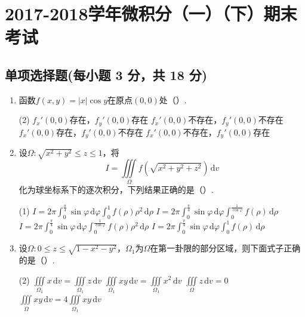 \documentclass[../main.tex]{subfiles}
\begin{document}
\chapter{2017-2018学年微积分（一）（下）期末考试}

\section{单项选择题(每小题 3 分，共 18 分)}
\begin{enumerate}
    \item 函数$f(x,y)=|x|\cos y$在原点$(0,0)$处（\qquad）.

          \begin{tasks}[label=\textbf{\Alph*.}, label-width=1.5em, column-sep=1em](2)
              \task $f_{x}'(0,0)$存在，$f_{y}'(0,0)$存在
              \task $f_{x}'(0,0)$不存在，$f_{y}'(0,0)$不存在
              \task $f_{x}'(0,0)$存在，$f_{y}'(0,0)$不存在
              \task $f_{x}'(0,0)$不存在，$f_{y}'(0,0)$存在
          \end{tasks}

    \item 设$\Omega:\sqrt{x^{2}+y^{2}}\leq z\leq1$，将
          \[
              I=\iiint\limits_{\Omega}f\left(\sqrt{x^{2}+y^{2}+z^{2}}\right)\,\mathrm{d}v
          \]
          化为球坐标系下的逐次积分，下列结果正确的是（\qquad）.

          \begin{tasks}[label=\textbf{\Alph*.}, label-width=1.5em, column-sep=1em](1)
              \task $\displaystyle I=2\pi\int_0^{\frac{\pi}{4}}\sin\varphi\,\mathrm{d}\varphi\int_0^1 f(\rho)\rho^2\,\mathrm{d}\rho$
              \task $\displaystyle I=2\pi\int_0^{\frac{\pi}{4}}\sin\varphi\,\mathrm{d}\varphi\int_0^{\frac{1}{\cos\varphi}} f(\rho)\,\mathrm{d}\rho$
              \task $\displaystyle I=2\pi\int_0^{\frac{\pi}{4}}\sin\varphi\,\mathrm{d}\varphi\int_0^{\frac{1}{\cos\varphi}} f(\rho)\rho^2\,\mathrm{d}\rho$
              \task $\displaystyle I=2\pi\int_0^{\frac{\pi}{4}}\sin\varphi\,\mathrm{d}\varphi\int_0^1 f(\rho)\,\mathrm{d}\rho$
          \end{tasks}

    \item 设$\Omega:0\leq z\leq\sqrt{1-x^{2}-y^{2}}$，$\Omega_{1}$为$\Omega$在第一卦限的部分区域，则下面式子正确的是（\qquad）.

          \begin{tasks}[label=\textbf{\Alph*.}, label-width=1.5em, column-sep=1em](2)
              \task $\displaystyle\iiint\limits_{\Omega_1}x\,\mathrm{d}v=\iiint\limits_{\Omega_1}z\,\mathrm{d}v$
              \task $\displaystyle\iiint\limits_{\Omega_1}xy\,\mathrm{d}v=\iiint\limits_{\Omega_1}x^2\,\mathrm{d}v$
              \task $\displaystyle\iiint\limits_{\Omega}z\,\mathrm{d}v=0$
              \task $\displaystyle\iiint\limits_{\Omega}xy\,\mathrm{d}v=4\iiint\limits_{\Omega_1}xy\,\mathrm{d}v$
          \end{tasks}


\end{enumerate}
\end{document}
